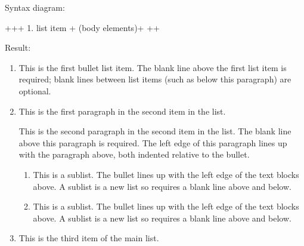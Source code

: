 \documentclass[letterpaper,12pt,english]{sphinxmanual}
\begin{document}
Syntax diagram:

\begin{sphinxVerbatim}[commandchars=\\\{\}]
+\PYGZhy{}\PYGZhy{}\PYGZhy{}\PYGZhy{}\PYGZhy{}\PYGZhy{}\PYGZhy{}+\PYGZhy{}\PYGZhy{}\PYGZhy{}\PYGZhy{}\PYGZhy{}\PYGZhy{}\PYGZhy{}\PYGZhy{}\PYGZhy{}\PYGZhy{}\PYGZhy{}\PYGZhy{}\PYGZhy{}\PYGZhy{}\PYGZhy{}\PYGZhy{}\PYGZhy{}\PYGZhy{}\PYGZhy{}\PYGZhy{}\PYGZhy{}\PYGZhy{}+
 \PYGZdq{}1. \PYGZdq{} \textbar{} list item            \textbar{}
+\PYGZhy{}\PYGZhy{}\PYGZhy{}\PYGZhy{}\PYGZhy{}\PYGZhy{}\PYGZhy{}\textbar{} (body elements)+     \textbar{}
        +\PYGZhy{}\PYGZhy{}\PYGZhy{}\PYGZhy{}\PYGZhy{}\PYGZhy{}\PYGZhy{}\PYGZhy{}\PYGZhy{}\PYGZhy{}\PYGZhy{}\PYGZhy{}\PYGZhy{}\PYGZhy{}\PYGZhy{}\PYGZhy{}\PYGZhy{}\PYGZhy{}\PYGZhy{}\PYGZhy{}\PYGZhy{}\PYGZhy{}+
\end{sphinxVerbatim}

Result:
\begin{enumerate}
\def\theenumi{\arabic{enumi}}
\def\labelenumi{\theenumi .}
\makeatletter\def\p@enumii{\p@enumi \theenumi .}\makeatother
\item {} 
This is the first bullet list item.  The blank line above the
first list item is required; blank lines between list items
(such as below this paragraph) are optional.

\item {} 
This is the first paragraph in the second item in the list.

This is the second paragraph in the second item in the list.
The blank line above this paragraph is required.  The left edge
of this paragraph lines up with the paragraph above, both
indented relative to the bullet.
\begin{enumerate}
\def\theenumii{\alph{enumii}}
\def\labelenumii{\theenumii .}
\makeatletter\def\p@enumiii{\p@enumii \theenumii .}\makeatother
\item {} 
This is a sublist.  The bullet lines up with the left edge of
the text blocks above.  A sublist is a new list so requires a
blank line above and below.

\item {} 
This is a sublist.  The bullet lines up with the left edge of
the text blocks above.  A sublist is a new list so requires a
blank line above and below.

\end{enumerate}

\item {} 
This is the third item of the main list.

\end{enumerate}
\end{document}
